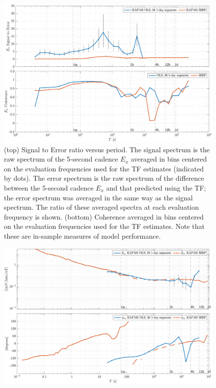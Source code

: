 \documentclass{article}
\begin{document}
\begin{figure}[h!]
\centering
\includegraphics[width=\textwidth]{figures/KAP103/SN_compare-E_x.pdf}
\caption{(top) Signal to Error ratio versus period. The signal spectrum is the raw spectrum of the 5-second cadence $E_x$ averaged in bins centered on the evaluation frequencies used for the TF estimates (indicated by dots). The error spectrum is the raw spectrum of the difference between the 5-second cadence $E_x$ and that predicted using the TF; the error spectrum was averaged in the same way as the signal spectrum. The ratio of these averaged spectra at each evaluation frequency is shown. (bottom) Coherence averaged in bins centered on the evaluation frequencies used for the TF estimates. Note that these are in-sample measures of model performance.}
\label{fig:universe}
\end{figure}

\clearpage

\begin{figure}[h!]
\centering
\includegraphics[width=\textwidth]{figures/KAP103/transferfnZ_compare-Z_xx_Magnitude_Phase.pdf}
\caption{}
\end{figure}
\end{document}

